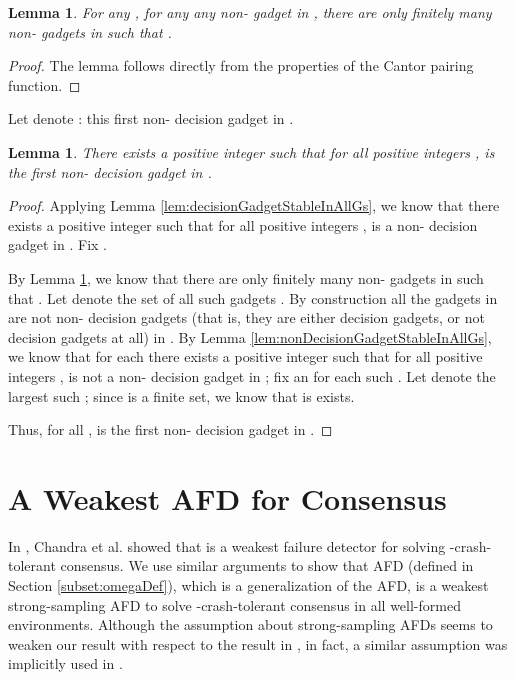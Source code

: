 \documentclass[11pt]{article}
\numberwithin{theorem}{section}
\newtheorem{lemma}[theorem]{Lemma}
\begin{document}
\begin{lemma}
\label{lem:finitelyManySmallerGadgetsInPrefix}
For any , for any any non- gadget  in , there are only finitely many non- gadgets  in  such that .
\end{lemma}
\begin{proof}
The lemma follows directly from the properties of the Cantor pairing function.
\end{proof}


Let  denote : this first non- decision gadget in .


\begin{lemma}\label{lem:minGadgetFoundInAllGs}
There exists a positive integer  such that for all positive integers ,  is the first non- decision gadget in .
\end{lemma}
\begin{proof}
Applying Lemma \ref{lem:decisionGadgetStableInAllGs}, we know that there exists a positive integer  such that for all positive integers ,  is a non- decision gadget in . Fix .

By Lemma \ref{lem:finitelyManySmallerGadgetsInPrefix}, we know that there are only finitely many non- gadgets  in  such that .
Let  denote the set of all such gadgets .
By construction all the gadgets in  are not non- decision gadgets (that is, they are either  decision gadgets, or not decision gadgets at all) in . 
By Lemma \ref{lem:nonDecisionGadgetStableInAllGs}, we know that for each   there exists a positive integer  such that for all positive integers ,  is not a non- decision gadget in ; fix an  for each such . Let  denote the largest such ; since  is a finite set, we know that  is exists.

Thus, for all ,  is the first non- decision gadget in .
\end{proof}


















\section{A Weakest AFD for Consensus}
\label{sec: wfd}



In \cite{chan:twfdf}, Chandra et al. showed that  is a weakest
failure detector for solving -crash-tolerant consensus. We use
similar arguments to show that AFD   (defined in Section
\ref{subset:omegaDef}), which is a generalization of the  AFD,
is a weakest strong-sampling AFD to solve
-crash-tolerant consensus in all well-formed environments. Although
the assumption about strong-sampling AFDs seems to weaken our result
with respect to the result in \cite{chan:twfdf}, in fact, a similar
assumption was implicitly used in \cite{chan:twfdf}.
\end{document}
